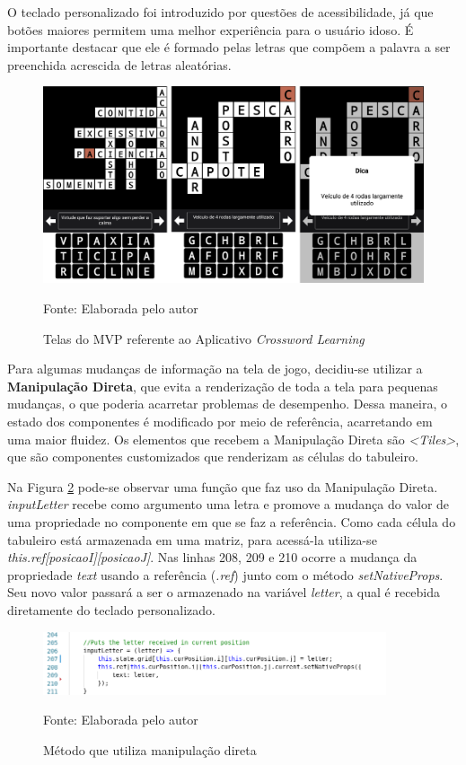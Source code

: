 O teclado personalizado foi introduzido por questões de acessibilidade, já que botões maiores permitem uma melhor experiência para o usuário idoso. É importante destacar que ele é formado pelas letras que compõem a palavra a ser preenchida acrescida de letras aleatórias.

\begin{figure}[H]
\centering
    \caption{Telas do MVP referente ao Aplicativo \textit{Crossword Learning}}
    \label{fig:mvp}
    \includegraphics[width=1.0\textwidth]{Figuras/mvp.png}
    
    Fonte: Elaborada pelo autor
\end{figure}

Para algumas mudanças de informação na tela de jogo, decidiu-se utilizar a \textbf{Manipulação Direta}, que evita a renderização de toda a tela para pequenas mudanças, o que poderia acarretar problemas de desempenho. Dessa maneira, o estado dos componentes é modificado por meio de referência, acarretando em uma maior fluidez. Os elementos que recebem a Manipulação Direta são \textit{<Tiles>}, que são componentes customizados que renderizam as células do tabuleiro. 

Na Figura \ref{fig:codeDirectManipulation} pode-se observar uma função que faz uso da Manipulação Direta. \textit{inputLetter} recebe como argumento uma letra e promove a mudança do valor de uma propriedade no componente em que se faz a referência. Como cada célula do tabuleiro está armazenada em uma matriz, para acessá-la utiliza-se \textit{this.ref[posicaoI][posicaoJ]}. Nas linhas 208, 209 e 210 ocorre a mudança da propriedade \textit{text} usando a referência (\textit{.ref}) junto com o método \textit{setNativeProps}. Seu novo valor passará a ser o armazenado na variável \textit{letter}, a qual é recebida diretamente do teclado personalizado.

\begin{figure}[H]
\centering
    \caption{Método que utiliza manipulação direta}
    \label{fig:codeDirectManipulation}
    \includegraphics[width=0.9\textwidth]{Figuras/codeDirectManipulation.png}
    
    Fonte: Elaborada pelo autor
\end{figure}